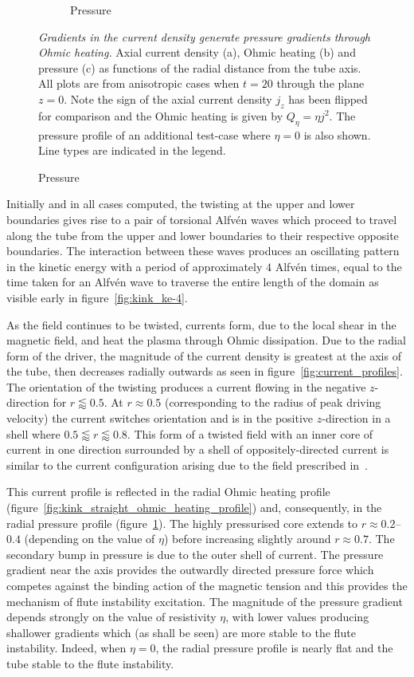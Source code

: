 \documentclass[fleqn,usenatbib]{mnras}
\newcommand{\mycaption}[2]{\caption[#1]{\emph{#1} #2}}
\begin{document}
\begin{figure}
\begin{subfigure}{0.32\textwidth}
      \caption{Pressure}
      \label{fig:pressure_profiles}
    \end{subfigure}
  \mycaption{ Gradients in the current density generate pressure gradients
  through Ohmic heating.}{Axial current density (a), Ohmic heating (b) and
  pressure (c) as functions of the radial distance from the tube axis. All
  plots are from anisotropic cases when $t=20$ through the plane $z=0$. Note
  the sign of the axial current density $j_z$ has been flipped for comparison
  and the Ohmic heating is given by $Q_{\eta} = \eta j^2$. The pressure profile
  of an additional test-case where $\eta=0$ is also shown. Line types are
  indicated in the legend.}
  \label{fig:pressure_and_heating}
\end{figure}

Initially and in all cases computed, the twisting at the upper and lower
boundaries gives rise to a pair of torsional Alfv\'en waves which proceed to
travel along the tube from the upper and lower boundaries to their respective
opposite boundaries. The interaction between these waves produces an
oscillating pattern in the kinetic energy with a period of approximately $4$
Alfv\'en times, equal to the time taken for an Alfv\'en wave to traverse the
entire length of the domain as visible early in figure~\ref{fig:kink_ke-4}. 

As the field continues to be twisted, currents form, due to the local shear in
the magnetic field, and heat the plasma through Ohmic dissipation. Due to the
radial form of the driver, the magnitude of the current density is greatest at
the axis of the tube, then decreases radially outwards as seen in
figure~\ref{fig:current_profiles}. The orientation of the twisting produces
a current flowing in the negative $z$-direction for $r\lessapprox0.5$. At $r
\approx 0.5$ (corresponding to the radius of peak driving velocity) the current
switches orientation and is in the positive $z$-direction in a shell where
$0.5\lessapprox r \lessapprox 0.8$. This form of a twisted field with an inner
core of current in one direction surrounded by a shell of oppositely-directed
current is similar to the current configuration arising due to the field
prescribed in~\citet{quinnEffectAnisotropicViscosity2020}. 

This current profile is reflected in the radial Ohmic heating profile
(figure~\ref{fig:kink_straight_ohmic_heating_profile}) and, consequently, in
the radial pressure profile (figure~\ref{fig:pressure_profiles}). The highly
pressurised core extends to $r\approx 0.2$--$0.4$ (depending on the value of
$\eta$) before increasing slightly around $r\approx 0.7$. The secondary bump in
pressure is due to the outer shell of current. The pressure gradient near the
axis provides the outwardly directed pressure force which competes against the
binding action of the magnetic tension and this provides the mechanism of flute
instability excitation.  The magnitude of the pressure gradient depends
strongly on the value of resistivity $\eta$, with lower values producing
shallower gradients which (as shall be seen) are more stable to the flute
instability. Indeed, when $\eta=0$, the radial pressure profile is nearly flat
and the tube stable to the flute instability.
\end{document}
